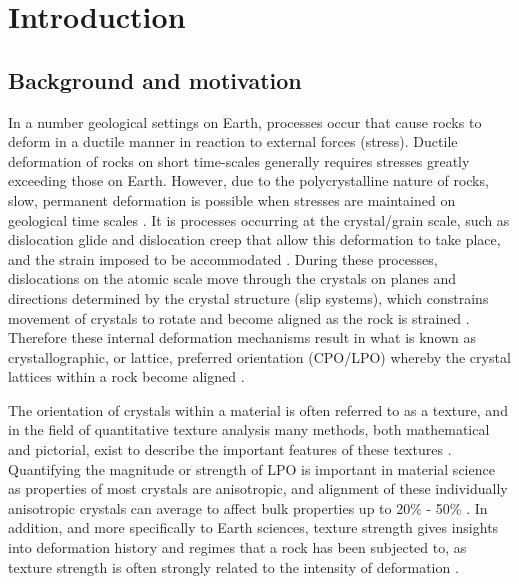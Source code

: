 \documentclass[a4paper,12pt,twoside]{report}
\numberwithin{equation}{chapter}
\begin{document}
\tableofcontents
\listoffigures
\listoftables



\chapter{Introduction} \label{chap:intro}
\vspace{-1cm}


\section{Background and motivation} \label{sec:background}
In a number geological settings on Earth, processes occur that cause rocks to deform in a ductile manner in reaction to external forces (stress). Ductile deformation of rocks on short time-scales generally requires stresses greatly exceeding those on Earth. However, due to the polycrystalline nature of rocks, slow, permanent deformation is possible when stresses are maintained on geological time scales \citep{Weiss1985}. It is processes occurring at the crystal/grain scale, such as dislocation glide and dislocation creep that allow this deformation to take place, and the strain imposed to be accommodated \citep{Ashby1972}. During these processes, dislocations on the atomic scale move through the crystals on planes and directions determined by the crystal structure (slip systems), which constrains movement of crystals to rotate and become aligned as the rock is strained \citep{Goulding2015}. Therefore these internal deformation mechanisms result in what is known as crystallographic, or lattice, preferred orientation (CPO/LPO) whereby the crystal lattices within a rock become aligned \citep{Price1985}.   

The orientation of crystals within a material is often referred to as a texture, and in the field of quantitative texture analysis many methods, both mathematical and pictorial, exist to describe the important features of these textures \citep[for introductory texts see][]{bunge1982texture,Bunge1985,Randle2000,Mainprice}. Quantifying the magnitude or strength of LPO is important in material science as properties of most crystals are anisotropic, and alignment of these individually anisotropic crystals can average to affect bulk properties up to 20\% - 50\% \citep{Randle2000}. In addition, and more specifically to Earth sciences, texture strength gives insights into deformation history and regimes that a rock has been subjected to, as texture strength is often strongly related to the intensity of deformation \citep{Weiss1985}.
\end{document}
